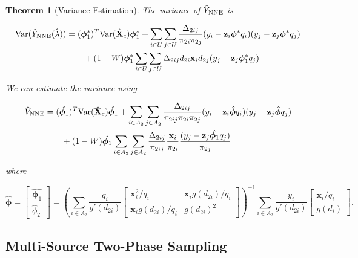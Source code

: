 \documentclass[12pt]{article}
\newtheorem{theorem}{Theorem}
\newcommand{\Var}{{\text{Var}}}
\renewcommand{\bf}[1]{\mathbf{#1}}
\begin{document}
\begin{theorem}[Variance Estimation]\label{thm:nnve}
  The variance of $\hat Y_{\rm NNE}$ is 

  \begin{align*}
    \Var(\hat Y_{\rm NNE}(\hat \lambda))
    &= (\bm \phi_1^*)^T \Var(\hat{\bf X}_c) \bm \phi_1^* + 
    \sum_{i \in U} \sum_{j \in U} \frac{\Delta_{2ij}}{\pi_{2i}\pi_{2j}} 
      (y_i - \bf z_i \bm \phi^* q_i)(y_j - \bf z_j \bm \phi^* q_j)\\
    &\qquad + (1 - W)\bm \phi_1^* \sum_{i \in U} \sum_{j \in U} \Delta_{2ij}
    d_{2i} \bf x_i d_{2j}(y_j - \bf z_j \bm \phi^*_1 q_j)\\
  \end{align*}

  We can estimate the variance using

  \begin{align*}
    \hat V_{\rm NNE} 
    &= (\hat{\bm \phi_1})^T \Var(\hat{\bf X}_c) \hat{\bm \phi_1} + 
    \sum_{i \in A_2} \sum_{j \in A_2} \frac{\Delta_{2ij}}{\pi_{2ij}\pi_{2i}\pi_{2j}} 
    (y_i - \bf z_i \hat{\bm \phi} q_i)(y_j - \bf z_j \hat{\bm \phi} q_j) \\
    &\qquad + (1 - W)\hat{\bm \phi_1} \sum_{i \in A_2} \sum_{j \in A_2} \frac{\Delta_{2ij}}{\pi_{2ij}}
    \frac{\bf x_i}{\pi_{2i}} \frac{(y_j - \bf z_j \hat{\bm \phi_1} q_j)}{\pi_{2j}}
  \end{align*}

  where 
  
  $$\hat{\bm \phi} =
  \begin{bmatrix}
    \hat{\bm \phi_1} \\ \hat \phi_2
  \end{bmatrix} = 
  \left(\sum_{i \in A_2} \frac{q_i}{g'(d_{2i})} 
  \begin{bmatrix}
    \bf x_i^2 / q_i & \bf x_i g(d_{2i}) / q_i \\
    \bf x_i g(d_{2i}) / q_i & g(d_{2i})^2
  \end{bmatrix}
  \right)^{-1}
  \sum_{i \in A_2} \frac{y_i}{g'(d_{2i})} 
  \begin{bmatrix} \bf x_i / q_i \\ g(d_i) \end{bmatrix}.
  $$
\end{theorem}

\subsection{Multi-Source Two-Phase Sampling}
\end{document}
